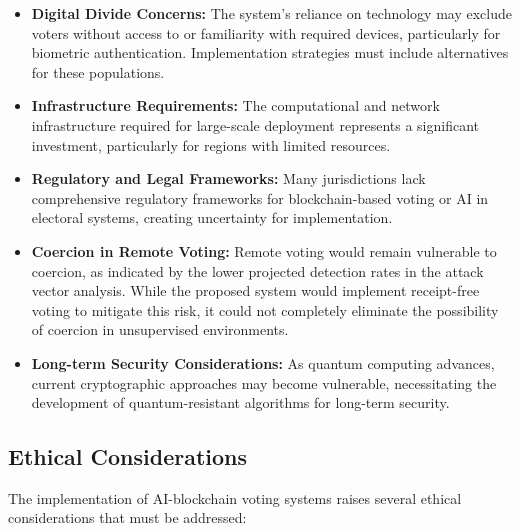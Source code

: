 \documentclass[conference]{IEEEtran}
\begin{document}
\begin{itemize}
    \item \textbf{Digital Divide Concerns:} The system's reliance on technology may exclude voters without access to or familiarity with required devices, particularly for biometric authentication. Implementation strategies must include alternatives for these populations.
    
    \item \textbf{Infrastructure Requirements:} The computational and network infrastructure required for large-scale deployment represents a significant investment, particularly for regions with limited resources.
    
    \item \textbf{Regulatory and Legal Frameworks:} Many jurisdictions lack comprehensive regulatory frameworks for blockchain-based voting or AI in electoral systems, creating uncertainty for implementation.
    
    \item \textbf{Coercion in Remote Voting:} Remote voting would remain vulnerable to coercion, as indicated by the lower projected detection rates in the attack vector analysis. While the proposed system would implement receipt-free voting to mitigate this risk, it could not completely eliminate the possibility of coercion in unsupervised environments.
    
    \item \textbf{Long-term Security Considerations:} As quantum computing advances, current cryptographic approaches may become vulnerable, necessitating the development of quantum-resistant algorithms for long-term security.
\end{itemize}

\subsection{Ethical Considerations}
The implementation of AI-blockchain voting systems raises several ethical considerations that must be addressed:
\end{document}

